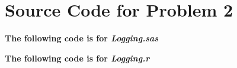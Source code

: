 \documentclass{article}
\begin{document}
\pagebreak


\appendix{} 


\section{Source Code for Problem 2}
\label{Problem2}

\textbf{The following code is for \emph{Logging.sas}}
%

\noindent \textbf{The following code is for \emph{Logging.r}}
%
\end{document}
